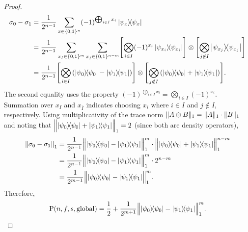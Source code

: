 \begin{proof}
\begin{equation}
    \begin{aligned}
        \sigma_0 - \sigma_1 &= \frac{1}{2^{n-1}} \sum_{x \in \bit^n} (-1)^{\bigoplus_{i \in I} x_i} \ketbra{\psi_x} \\
        &= \frac{1}{2^{n-1}} \sum_{x_I \in \bit^m} \sum_{x_{\bar{I}} \in \bit^{n-m}} \Biggl[\bigotimes_{i \in I} (-1)^{x_i} \ketbra{\psi_{x_i}}\Biggr] \otimes \Biggl[\bigotimes_{j \notin I} \ketbra{\psi_{x_j}}\Biggr] \\
        &= \frac{1}{2^{n-1}} \Biggl[\bigotimes_{i \in I} \left( \ketbra{\psi_0} - \ketbra{\psi_1} \right) \Biggr] \otimes \Biggl[\bigotimes_{j \notin I} \left( \ketbra{\psi_0} + \ketbra{\psi_1} \right) \Biggr].
    \end{aligned}
    \end{equation}
    The second equality uses the property $(-1)^{\bigoplus_{i \in I} x_i} = \bigotimes_{i \in I} (-1)^{x_i}$.
    Summation over $x_I$ and $x_{\bar{I}}$ indicates choosing $x_i$ where $i \in I$ and $j \notin I$, respectively.
    Using multiplicativity of the trace norm $\norm{A \otimes B}_1 = \norm{A}_1 \cdot \norm{B}_1$ and noting that $\norm[\Big]{ \ketbra{\psi_0} + \ketbra{\psi_1} }_1 = 2$ (since both are density operators),%
    \begin{equation}
    \begin{aligned}
        \norm*{\sigma_0 - \sigma_1}_1
        &= \frac{1}{2^{n-1}} \norm[\Big]{ \ketbra{\psi_0} - \ketbra{\psi_1} }_1^m \cdot \norm[\Big]{ \ketbra{\psi_0} + \ketbra{\psi_1} }_1^{n-m} \\
        &= \frac{1}{2^{n-1}} \norm[\Big]{ \ketbra{\psi_0} - \ketbra{\psi_1} }_1^m \cdot 2^{n-m} \\
        &= \frac{1}{2^{m-1}} \norm[\Big]{ \ketbra{\psi_0} - \ketbra{\psi_1} }_1^m.
    \end{aligned}
    \end{equation}
    Therefore,
    \begin{equation}
        \P(n,f,s,\glo) = \frac{1}{2} + \frac{1}{2^{m+1}} \norm[\Big]{ \ketbra{\psi_0} - \ketbra{\psi_1} }_1^m.
    \end{equation}


\end{proof}
